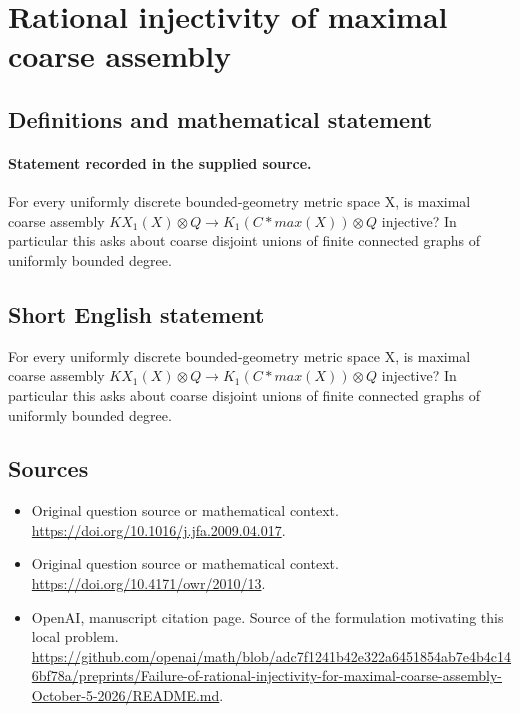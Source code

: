 \documentclass[11pt]{article}
\begin{document}
\section*{Rational injectivity of maximal coarse assembly}\label{statement}
\subsection{Definitions and mathematical statement}
\paragraph{Statement recorded in the supplied source.}
For every uniformly discrete bounded-geometry metric space X, is maximal coarse assembly $KX_{1}(X)\otimes Q\to K_{1}(C*max(X))\otimes Q$ injective? In particular this asks about coarse disjoint unions of finite connected graphs of uniformly bounded degree.
\subsection{Short English statement}
For every uniformly discrete bounded-geometry metric space X, is maximal coarse assembly $KX_{1}(X)\otimes Q\to K_{1}(C*max(X))\otimes Q$ injective? In particular this asks about coarse disjoint unions of finite connected graphs of uniformly bounded degree.
\subsection{Sources}
\begin{itemize}
\item[S1] Original question source or mathematical context.
\url{https://doi.org/10.1016/j.jfa.2009.04.017}.
\item[S2] Original question source or mathematical context.
\url{https://doi.org/10.4171/owr/2010/13}.
\item[S3] OpenAI, manuscript citation page. Source of the formulation motivating this local problem.
\url{https://github.com/openai/math/blob/adc7f1241b42e322a6451854ab7e4b4c146bf78a/preprints/Failure-of-rational-injectivity-for-maximal-coarse-assembly-October-5-2026/README.md}.
\end{itemize}
\end{document}
